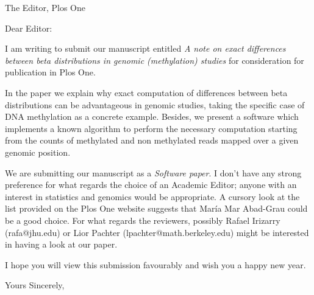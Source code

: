 \documentclass{letter}
\begin{document}
\begin{letter}{The Editor, Plos One}
\opening{Dear Editor:}
I am writing to submit our manuscript entitled \emph{A note on exact differences between beta distributions in genomic (methylation) studies} for consideration for publication in Plos One.

In the paper we explain why exact computation of differences between beta distributions can be advantageous in genomic studies, taking the specific case of DNA methylation as a concrete example. Besides, we present a software which implements a known algorithm to perform the necessary computation starting from the counts of methylated and non methylated reads mapped over a given genomic position.

We are submitting our manuscript as a \emph{Software paper}. I don't have any strong preference for what regards the choice of an Academic Editor; anyone with an interest in statistics and genomics would be appropriate. A cursory look at the list provided on the Plos One website suggests that María Mar Abad-Grau could be a good choice. For what regards the reviewers, possibly Rafael Irizarry (rafa@jhu.edu) or Lior Pachter (lpachter@math.berkeley.edu) might be interested in having a look at our paper.

I hope you will view this submission favourably and wish you a happy new year.
\closing{Yours Sincerely,}
\end{letter}
\end{document}
